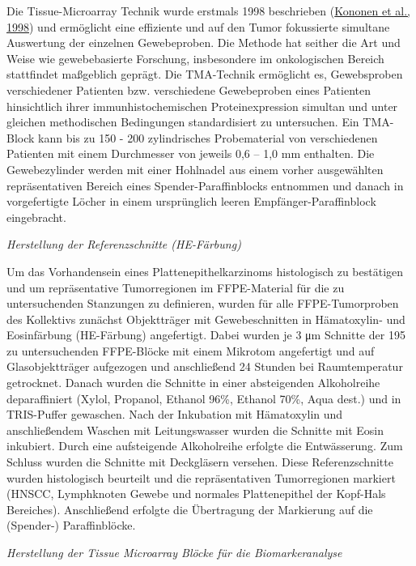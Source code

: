 Die Tissue-Microarray Technik wurde erstmals 1998 beschrieben (\href{about:blank\#_ENREF_46}{Kononen et al., 1998}) und ermöglicht eine effiziente und auf den Tumor fokussierte simultane Auswertung der einzelnen Gewebeproben. Die Methode hat seither die Art und Weise wie gewebebasierte Forschung, insbesondere im onkologischen Bereich stattfindet maßgeblich geprägt. Die TMA-Technik ermöglicht es, Gewebsproben verschiedener Patienten bzw. verschiedene Gewebeproben eines Patienten hinsichtlich ihrer immunhistochemischen Proteinexpression simultan und unter gleichen methodischen Bedingungen standardisiert zu untersuchen. Ein TMA-Block kann bis zu 150 - 200 zylindrisches Probematerial von verschiedenen Patienten mit einem Durchmesser von jeweils 0,6 -- 1,0 mm enthalten. Die Gewebezylinder werden mit einer Hohlnadel aus einem vorher ausgewählten repräsentativen Bereich eines Spender-Paraffinblocks entnommen und danach in vorgefertigte Löcher in einem ursprünglich leeren Empfänger-Paraffinblock eingebracht.

\emph{Herstellung der Referenzschnitte (HE-Färbung)}

Um das Vorhandensein eines Plattenepithelkarzinoms histologisch zu bestätigen und um repräsentative Tumorregionen im FFPE-Material für die zu untersuchenden Stanzungen zu definieren, wurden für alle FFPE-Tumorproben des Kollektivs zunächst Objektträger mit Gewebeschnitten in Hämatoxylin- und Eosinfärbung (HE-Färbung) angefertigt. Dabei wurden je 3 μm Schnitte der 195 zu untersuchenden FFPE-Blöcke mit einem Mikrotom angefertigt und auf Glasobjektträger aufgezogen und anschließend 24 Stunden bei Raumtemperatur getrocknet. Danach wurden die Schnitte in einer absteigenden Alkoholreihe deparaffiniert (Xylol, Propanol, Ethanol 96\%, Ethanol 70\%, Aqua dest.) und in TRIS-Puffer gewaschen. Nach der Inkubation mit Hämatoxylin und anschließendem Waschen mit Leitungswasser wurden die Schnitte mit Eosin inkubiert. Durch eine aufsteigende Alkoholreihe erfolgte die Entwässerung. Zum Schluss wurden die Schnitte mit Deckgläsern versehen. Diese Referenzschnitte wurden histologisch beurteilt und die repräsentativen Tumorregionen markiert (HNSCC, Lymphknoten Gewebe und normales Plattenepithel der Kopf-Hals Bereiches). Anschließend erfolgte die Übertragung der Markierung auf die (Spender-) Paraffinblöcke.

\emph{Herstellung der Tissue Microarray Blöcke für die Biomarkeranalyse}

